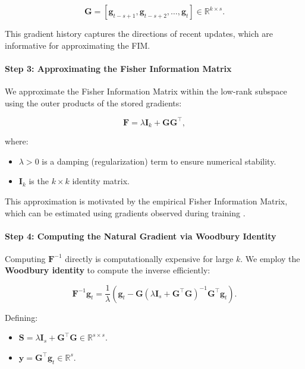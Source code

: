 \[
\mathbf{G} = [\mathbf{g}_{t - s + 1}, \mathbf{g}_{t - s + 2}, \dots, \mathbf{g}_t] \in \mathbb{R}^{k \times s}.
\]

This gradient history captures the directions of recent updates, which are informative for approximating the FIM.

\paragraph{Step 3: Approximating the Fisher Information Matrix}

We approximate the Fisher Information Matrix within the low-rank subspace using the outer products of the stored gradients:

\[
\mathbf{F} = \lambda \mathbf{I}_k + \mathbf{G} \mathbf{G}^\top,
\]

where:

\begin{itemize}
    \item $\lambda > 0$ is a damping (regularization) term to ensure numerical stability.
    \item $\mathbf{I}_k$ is the $k \times k$ identity matrix.
\end{itemize}

This approximation is motivated by the empirical Fisher Information Matrix, which can be estimated using gradients observed during training \citep{martensNewPerspectiveNatural2014}.

\paragraph{Step 4: Computing the Natural Gradient via Woodbury Identity}

Computing $\mathbf{F}^{-1}$ directly is computationally expensive for large $k$. We employ the \textbf{Woodbury identity} to compute the inverse efficiently:

\[
\mathbf{F}^{-1} \mathbf{g}_t = \frac{1}{\lambda} \left( \mathbf{g}_t - \mathbf{G} \left( \lambda \mathbf{I}_s + \mathbf{G}^\top \mathbf{G} \right)^{-1} \mathbf{G}^\top \mathbf{g}_t \right).
\]

Defining:

\begin{itemize}
    \item $\mathbf{S} = \lambda \mathbf{I}_s + \mathbf{G}^\top \mathbf{G} \in \mathbb{R}^{s \times s}$.
    \item $\mathbf{y} = \mathbf{G}^\top \mathbf{g}_t \in \mathbb{R}^s$.
\end{itemize}


